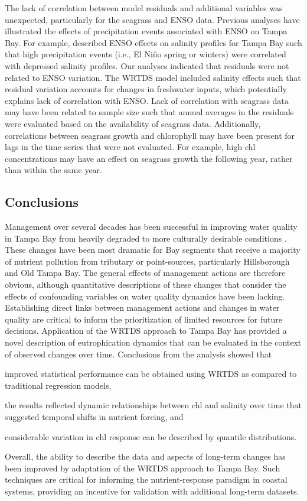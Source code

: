 \documentclass[letterpaper,12pt,oneside]{article}\usepackage{graphicx, color}
\begin{document}
The lack of correlation between model residuals and additional variables was unexpected, particularly for the seagrass and \ac{ENSO} data.  Previous analyses have illustrated the effects of precipitation events associated with \ac{ENSO} on Tampa Bay.  For example, \citet{Schmidt02} described \ac{ENSO} effects on salinity profiles for Tampa Bay such that high precipitation events (i.e., El Ni\~{n}o spring or winters) were correlated with depressed salinity profiles.  Our analyses indicated that residuals were not related to \ac{ENSO} variation.  The \ac{WRTDS} model included salinity effects such that residual variation accounts for changes in freshwater inputs, which potentially explains lack of correlation with \ac{ENSO}. Lack of correlation with seagrass data may have been related to sample size such that annual averages in the residuals were evaluated based on the availability of seagrass data.  Additionally, correlations between seagrass growth and chlorophyll may have been present for lags in the time series that were not evaluated.  For example, high \ac{chl} concentrations may have an effect on seagrass growth the following year, rather than within the same year.

\subsection{Conclusions}

Management over several decades has been successful in improving water quality in Tampa Bay from heavily degraded to more culturally desirable conditions \citep{Greening06}.  These changes have been most dramatic for Bay segments that receive a majority of nutrient pollution from tributary or point-sources, particularly Hillsborough and Old Tampa Bay.  The general effects of management actions are therefore obvious, although quantitative descriptions of these changes that consider the effects of confounding variables on water quality dynamics have been lacking.  Establishing direct links between management actions and changes in water quality are critical to inform the prioritization of limited resources for future decisions.  Application of the \ac{WRTDS} approach to Tampa Bay has provided a novel description of eutrophication dynamics that can be evaluated in the context of observed changes over time.  Conclusions from the analysis showed that\begin{inparaenum}[1\upshape)]
\item improved statistical performance can be obtained using \ac{WRTDS} as compared to traditional regression models,
\item the results reflected dynamic relationships between \ac{chl} and salinity over time that suggested temporal shifts in nutrient forcing, and 
\item considerable variation in \ac{chl} response can be described by quantile distributions.
\end{inparaenum}
Overall, the ability to describe the data and aspects of long-term changes has been improved by adaptation of the \ac{WRTDS} approach to Tampa Bay. Such techniques are critical for informing the nutrient-response paradigm in coastal systems, providing an incentive for validation with additional long-term datasets.
\end{document}
